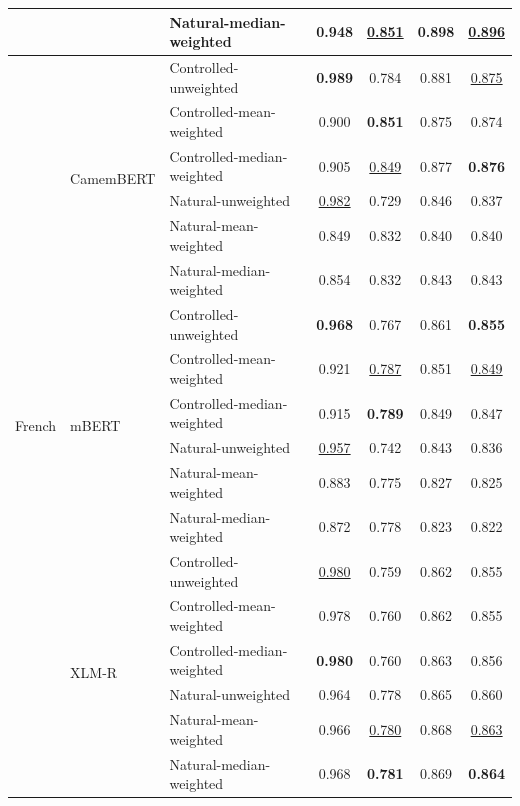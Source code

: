 \begin{table}[t]
\begin{tabular}{lllcccc}
 &  & Natural-median-weighted & 0.948 & \underline{0.851} & 0.898 & \underline{0.896} \\
\midrule
\multirow{18}{*}{French} & \multirow{6}{*}{CamemBERT} & Controlled-unweighted & \textbf{0.989} & 0.784 & 0.881 & \underline{0.875} \\
 &  & Controlled-mean-weighted & 0.900 & \textbf{0.851} & 0.875 & 0.874 \\
 &  & Controlled-median-weighted & 0.905 & \underline{0.849} & 0.877 & \textbf{0.876} \\
 &  & Natural-unweighted & \underline{0.982} & 0.729 & 0.846 & 0.837 \\
 &  & Natural-mean-weighted & 0.849 & 0.832 & 0.840 & 0.840 \\
 &  & Natural-median-weighted & 0.854 & 0.832 & 0.843 & 0.843 \\
\cmidrule(lr){2-7}
 & \multirow{6}{*}{mBERT} & Controlled-unweighted & \textbf{0.968} & 0.767 & 0.861 & \textbf{0.855} \\
 &  & Controlled-mean-weighted & 0.921 & \underline{0.787} & 0.851 & \underline{0.849} \\
 &  & Controlled-median-weighted & 0.915 & \textbf{0.789} & 0.849 & 0.847 \\
 &  & Natural-unweighted & \underline{0.957} & 0.742 & 0.843 & 0.836 \\
 &  & Natural-mean-weighted & 0.883 & 0.775 & 0.827 & 0.825 \\
 &  & Natural-median-weighted & 0.872 & 0.778 & 0.823 & 0.822 \\
\cmidrule(lr){2-7}
 & \multirow{6}{*}{XLM-R} & Controlled-unweighted & \underline{0.980} & 0.759 & 0.862 & 0.855 \\
 &  & Controlled-mean-weighted & 0.978 & 0.760 & 0.862 & 0.855 \\
 &  & Controlled-median-weighted & \textbf{0.980} & 0.760 & 0.863 & 0.856 \\
 &  & Natural-unweighted & 0.964 & 0.778 & 0.865 & 0.860 \\
 &  & Natural-mean-weighted & 0.966 & \underline{0.780} & 0.868 & \underline{0.863} \\
 &  & Natural-median-weighted & 0.968 & \textbf{0.781} & 0.869 & \textbf{0.864} \\
\bottomrule
\end{tabular}
\end{table}
